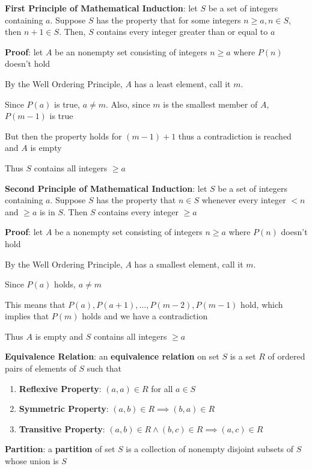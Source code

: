 \documentclass{article}
\begin{document}
 \bigskip

 \textbf{First Principle of Mathematical Induction}: let $S$ be a set of integers containing $a$. Suppose $S$ has the property that for some integers $n \geq a, n \in S$, then $n + 1 \in S$. Then, $S$ contains every integer greater than or equal to $a$

 \textbf{Proof}: let $A$ be an nonempty set consisting of integers $n \geq a$ where $P(n)$ doesn't hold

 By the Well Ordering Principle, $A$ has a least element, call it $m$.

 Since $P(a)$ is true, $a \neq m$. Also, since $m$ is the smallest member of $A$, $P(m-1)$ is true

 But then the property holds for $(m-1) + 1$ thus a contradiction is reached and $A$ is empty

 Thus $S$ contains all integers $\geq a$

 \bigskip

 \textbf{Second Principle of Mathematical Induction}: let $S$ be a set of integers containing $a$. Suppose $S$ has the property that $n \in S$ whenever every integer $< n$ and $\geq a$ is in $S$. Then $S$ contains every integer $\geq a$

 \textbf{Proof}: let $A$ be a nonempty set consisting of integers $n \geq a$ where $P(n)$ doesn't hold

 By the Well Ordering Principle, $A$ has a smallest element, call it $m$. 

 Since $P(a)$ holds, $a \neq m$

 This means that $P(a), P(a+1), \ldots, P(m-2), P(m-1)$ hold, which implies that $P(m)$ holds and we have a contradiction

 Thus $A$ is empty and $S$ contains all integers $\geq a$

 \bigskip

 \textbf{Equivalence Relation}: an \textbf{equivalence relation} on set $S$ is a set $R$ of ordered pairs of elements of $S$ such that
 \begin{enumerate}
   \item \textbf{Reflexive Property}: $(a, a) \in R$ for all $a \in S$
   \item \textbf{Symmetric Property}: $(a, b) \in R \implies (b, a) \in R$
    \item \textbf{Transitive Property}: $(a, b) \in R \wedge (b, c) \in R \implies (a, c) \in R$
 \end{enumerate}

 \textbf{Partition}: a \textbf{partition} of set $S$ is a collection of nonempty disjoint subsets of $S$ whose union is $S$
\end{document}

